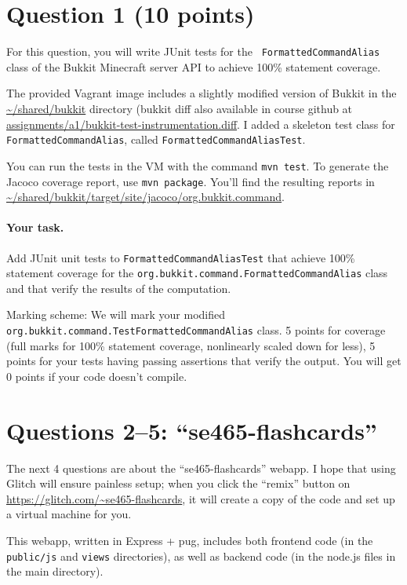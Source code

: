 \documentclass[10pt,hidelinks]{article}
\begin{document}
\newpage

\section*{Question 1 (10 points)}
For this question, you will write JUnit tests for the {\tt
  FormattedCommandAlias} class of the Bukkit Minecraft server API to
achieve 100\% statement coverage.

The provided Vagrant image includes a slightly modified version of
Bukkit in the \url{~/shared/bukkit} directory (bukkit diff also available in course
github at \url{assignments/a1/bukkit-test-instrumentation.diff}.  
I added a skeleton test class for {\tt
  FormattedCommandAlias}, called {\tt FormattedCommandAliasTest}.

You can run the tests in the VM with the command {\tt mvn test}.  To
generate the Jacoco coverage report, use {\tt mvn package}. You'll
find the resulting reports in
\url{~/shared/bukkit/target/site/jacoco/org.bukkit.command}.

\paragraph{Your task.} Add JUnit unit tests to {\tt FormattedCommandAliasTest}
that achieve 100\% statement 
coverage for the {\tt org.bukkit.command.FormattedCommandAlias} class
and that verify the results of the computation.

Marking scheme: We will mark your modified {\tt
  org.bukkit.command.TestFormattedCommandAlias} class.  5 points for
coverage (full marks for 100\% statement coverage, nonlinearly scaled
down for less), 5 points for your tests having passing assertions that
verify the output. You will get 0 points if your code doesn't compile.

\section*{Questions 2--5: ``se465-flashcards''}
The next 4 questions are about the ``se465-flashcards'' webapp.
I hope that using Glitch will ensure painless setup; when you click the
``remix'' button on \url{https://glitch.com/~se465-flashcards},
it will create a copy of the code and set up a virtual machine for you.

This webapp, written in Express + pug, includes both frontend code (in
the {\tt public/js} and {\tt views} directories), as well as backend code
(in the node.js files in the main directory).
\end{document}
